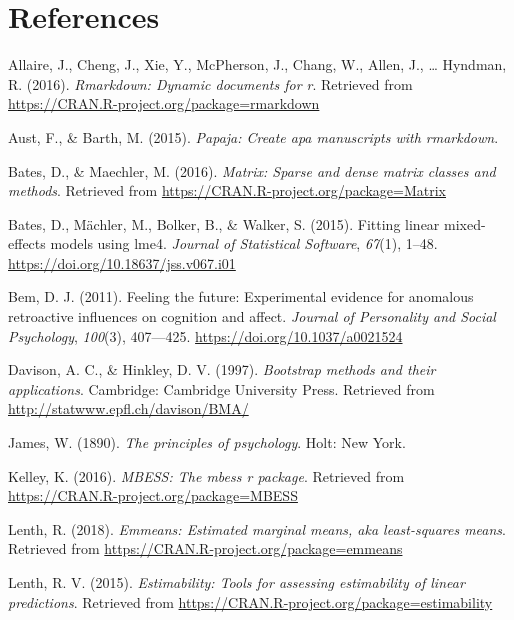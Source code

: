 \documentclass[english,man,floatsintext]{apa6}
\begin{document}
\hypertarget{references}{%
\section{References}\label{references}}

\setlength{\parindent}{-0.5in}
\setlength{\leftskip}{0.5in}

\hypertarget{refs}{}
\leavevmode\hypertarget{ref-R-rmarkdown}{}%
Allaire, J., Cheng, J., Xie, Y., McPherson, J., Chang, W., Allen, J., \ldots{} Hyndman, R. (2016). \emph{Rmarkdown: Dynamic documents for r}. Retrieved from \url{https://CRAN.R-project.org/package=rmarkdown}

\leavevmode\hypertarget{ref-R-papaja}{}%
Aust, F., \& Barth, M. (2015). \emph{Papaja: Create apa manuscripts with rmarkdown}.

\leavevmode\hypertarget{ref-R-Matrix}{}%
Bates, D., \& Maechler, M. (2016). \emph{Matrix: Sparse and dense matrix classes and methods}. Retrieved from \url{https://CRAN.R-project.org/package=Matrix}

\leavevmode\hypertarget{ref-R-lme4}{}%
Bates, D., Mächler, M., Bolker, B., \& Walker, S. (2015). Fitting linear mixed-effects models using lme4. \emph{Journal of Statistical Software}, \emph{67}(1), 1--48. \url{https://doi.org/10.18637/jss.v067.i01}

\leavevmode\hypertarget{ref-bem_2011}{}%
Bem, D. J. (2011). Feeling the future: Experimental evidence for anomalous retroactive influences on cognition and affect. \emph{Journal of Personality and Social Psychology}, \emph{100}(3), 407---425. \url{https://doi.org/10.1037/a0021524}

\leavevmode\hypertarget{ref-R-boot}{}%
Davison, A. C., \& Hinkley, D. V. (1997). \emph{Bootstrap methods and their applications}. Cambridge: Cambridge University Press. Retrieved from \url{http://statwww.epfl.ch/davison/BMA/}

\leavevmode\hypertarget{ref-james_1890}{}%
James, W. (1890). \emph{The principles of psychology}. Holt: New York.

\leavevmode\hypertarget{ref-R-MBESS}{}%
Kelley, K. (2016). \emph{MBESS: The mbess r package}. Retrieved from \url{https://CRAN.R-project.org/package=MBESS}

\leavevmode\hypertarget{ref-R-emmeans}{}%
Lenth, R. (2018). \emph{Emmeans: Estimated marginal means, aka least-squares means}. Retrieved from \url{https://CRAN.R-project.org/package=emmeans}

\leavevmode\hypertarget{ref-R-estimability}{}%
Lenth, R. V. (2015). \emph{Estimability: Tools for assessing estimability of linear predictions}. Retrieved from \url{https://CRAN.R-project.org/package=estimability}
\end{document}
